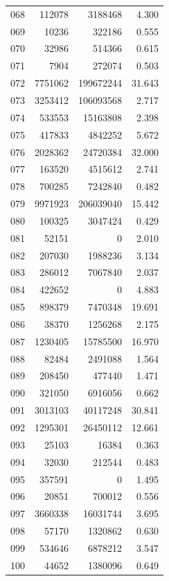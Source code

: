 \documentclass[anonymous,notoc]{gmcm2026}
\begin{document}
\begin{longtable}{lrrr}
068 & 112078 & 3188468 & 4.300 \\
069 & 10236 & 322186 & 0.555 \\
070 & 32986 & 514366 & 0.615 \\
071 & 7904 & 272074 & 0.503 \\
072 & 7751062 & 199672244 & 31.643 \\
073 & 3253412 & 106093568 & 2.717 \\
074 & 533553 & 15163808 & 2.398 \\
075 & 417833 & 4842252 & 5.672 \\
076 & 2028362 & 24720384 & 32.000 \\
077 & 163520 & 4515612 & 2.741 \\
078 & 700285 & 7242840 & 0.482 \\
079 & 9971923 & 206039040 & 15.442 \\
080 & 100325 & 3047424 & 0.429 \\
081 & 52151 & 0 & 2.010 \\
082 & 207030 & 1988236 & 3.134 \\
083 & 286012 & 7067840 & 2.037 \\
084 & 422652 & 0 & 4.883 \\
085 & 898379 & 7470348 & 19.691 \\
086 & 38370 & 1256268 & 2.175 \\
087 & 1230405 & 15785500 & 16.970 \\
088 & 82484 & 2491088 & 1.564 \\
089 & 208450 & 477440 & 1.471 \\
090 & 321050 & 6916056 & 0.662 \\
091 & 3013103 & 40117248 & 30.841 \\
092 & 1295301 & 26450112 & 12.661 \\
093 & 25103 & 16384 & 0.363 \\
094 & 32030 & 212544 & 0.483 \\
095 & 357591 & 0 & 1.495 \\
096 & 20851 & 700012 & 0.556 \\
097 & 3660338 & 16031744 & 3.695 \\
098 & 57170 & 1320862 & 0.630 \\
099 & 534646 & 6878212 & 3.547 \\
100 & 44652 & 1380096 & 0.649 \\
\end{longtable}
\end{document}
